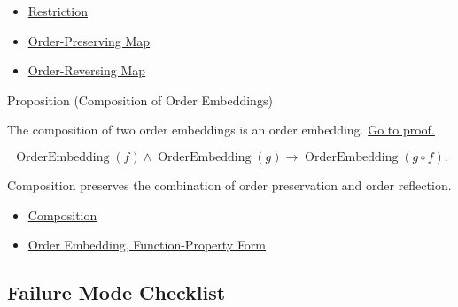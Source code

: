 \begin{dependencies}
\begin{itemize}
  \item \hyperref[def:restriction]{Restriction}
  \item \hyperref[def:order-preserving-map-ordered-sets]{Order-Preserving Map}
  \item \hyperref[def:order-reversing-map]{Order-Reversing Map}
\end{itemize}
\end{dependencies}

\begin{propositionbox}{Proposition (Composition of Order Embeddings)}
\begin{proposition}\label{prop:composition-order-embeddings}
The composition of two order embeddings is an order embedding.
\hyperref[prf:composition-order-embeddings]{Go to proof.}
\end{proposition}
\end{propositionbox}

\begin{remark*}
\[
  \operatorname{OrderEmbedding}(f)\wedge\operatorname{OrderEmbedding}(g)
  \to
  \operatorname{OrderEmbedding}(g\circ f).
\]
\end{remark*}

\begin{remark*}[Interpretation]
Composition preserves the combination of order preservation and order
reflection.
\end{remark*}

\begin{dependencies}
\begin{itemize}
  \item \hyperref[def:composition]{Composition}
  \item \hyperref[def:order-embedding-function-form]{Order Embedding, Function-Property Form}
\end{itemize}
\end{dependencies}

\subsection*{Failure Mode Checklist}

